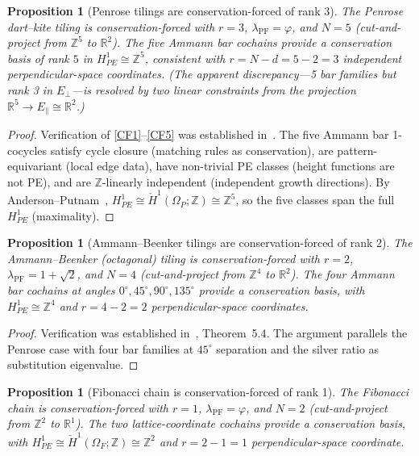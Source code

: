 \documentclass[12pt]{article}
\newtheorem{proposition}[theorem]{Proposition}
\theoremstyle{definition}
\theoremstyle{remark}
\newcommand{\RR}{\mathbb{R}}
\newcommand{\ZZ}{\mathbb{Z}}
\newcommand{\Hcech}{\check{H}}
\DeclareMathOperator{\PF}{PF}
\begin{document}
\begin{proposition}[Penrose tilings are conservation-forced of rank 3]
\label{prop:penrose}
The Penrose dart--kite tiling is conservation-forced with $r = 3$, $\lambda_\PF = \varphi$, and $N = 5$ (cut-and-project from $\ZZ^5$ to $\RR^2$). The five Ammann bar cochains provide a conservation basis of rank $5$ in $H^1_{PE} \cong \ZZ^5$, consistent with $r = N - d = 5 - 2 = 3$ independent perpendicular-space coordinates. (The apparent discrepancy---5 bar families but rank 3 in $E_\perp$---is resolved by two linear constraints from the projection $\RR^5 \to E_\parallel \cong \RR^2$.)
\end{proposition}

\begin{proof}
Verification of \ref{CF1}--\ref{CF5} was established in~\cite{PardoGuerraGolden2026,PardoGuerraCohom2026}. The five Ammann bar 1-cocycles satisfy cycle closure (matching rules as conservation), are pattern-equivariant (local edge data), have non-trivial PE classes (height functions are not PE), and are $\ZZ$-linearly independent (independent growth directions). By Anderson--Putnam~\cite{AndersonPutnam1998}, $H^1_{PE} \cong \Hcech^1(\Omega_P; \ZZ) \cong \ZZ^5$, so the five classes span the full $H^1_{PE}$ (maximality).
\end{proof}

\begin{proposition}[Ammann--Beenker tilings are conservation-forced of rank 2]
\label{prop:AB}
The Ammann--Beenker (octagonal) tiling is conservation-forced with $r = 2$, $\lambda_\PF = 1 + \sqrt{2}$, and $N = 4$ (cut-and-project from $\ZZ^4$ to $\RR^2$). The four Ammann bar cochains at angles $0^\circ, 45^\circ, 90^\circ, 135^\circ$ provide a conservation basis, with $H^1_{PE} \cong \ZZ^4$ and $r = 4 - 2 = 2$ perpendicular-space coordinates.
\end{proposition}

\begin{proof}
Verification was established in~\cite{PardoGuerraCohom2026}, Theorem~5.4. The argument parallels the Penrose case with four bar families at $45^\circ$ separation and the silver ratio as substitution eigenvalue.
\end{proof}

\begin{proposition}[Fibonacci chain is conservation-forced of rank 1]
\label{prop:fibonacci}
The Fibonacci chain is conservation-forced with $r = 1$, $\lambda_\PF = \varphi$, and $N = 2$ (cut-and-project from $\ZZ^2$ to $\RR^1$). The two lattice-coordinate cochains provide a conservation basis, with $H^1_{PE} \cong \Hcech^1(\Omega_F; \ZZ) \cong \ZZ^2$ and $r = 2 - 1 = 1$ perpendicular-space coordinate.
\end{proposition}
\end{document}
